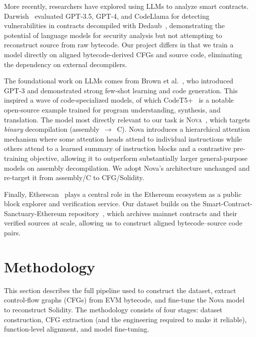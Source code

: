 \documentclass{article}
\begin{document}
More recently, researchers have explored using LLMs to analyze smart contracts.
Darwish~\cite{darwish2023bytecode} evaluated GPT-3.5, GPT-4, and CodeLlama for
detecting vulnerabilities in contracts decompiled with
Dedaub~\cite{neville2023dedaub}, demonstrating the potential of language models for
security analysis but not attempting to reconstruct source from raw bytecode. Our
project differs in that we train a model directly on aligned bytecode-derived CFGs
and source code, eliminating the dependency on external decompilers.

The foundational work on LLMs comes from Brown et al.~\cite{brown2020language}, who
introduced GPT-3 and demonstrated strong few-shot learning and code generation.
This inspired a wave of code-specialized models, of which
CodeT5+~\cite{wang2023codet5plus} is a notable open-source example trained for
program understanding, synthesis, and translation. The model most directly
relevant to our task is \textsc{Nova}~\cite{jiang2025nova}, which targets
\emph{binary} decompilation (assembly~$\rightarrow$~C). Nova introduces a
hierarchical attention mechanism where some attention heads attend to individual
instructions while others attend to a learned summary of instruction blocks and a
contrastive pre-training objective, allowing it to outperform substantially larger
general-purpose models on assembly decompilation. We adopt Nova's architecture
unchanged and re-target it from assembly/C to CFG/Solidity.

Finally, Etherscan~\cite{etherscan} plays a central role in the Ethereum ecosystem
as a public block explorer and verification service. Our dataset builds on the
Smart-Contract-Sanctuary-Ethereum repository~\cite{smart_contract_sanctuary}, which
archives mainnet contracts and their verified sources at scale, allowing us to
construct aligned bytecode--source code pairs.

\section{Methodology}

This section describes the full pipeline used to construct the dataset, extract
control-flow graphs (CFGs) from EVM bytecode, and fine-tune the Nova model to
reconstruct Solidity. The methodology consists of four stages: dataset
construction, CFG extraction (and the engineering required to make it reliable),
function-level alignment, and model fine-tuning.
\end{document}
